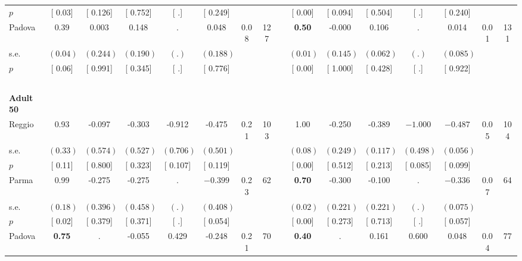 \begin{longtable}{L{8em} c c c c c c c p{1em} c c c c c c c}
\quad \quad \quad \quad $ p$ & [     0.03] & [    0.126] & [    0.752] & [        .] & [    0.249] & & & & [     0.00] & [    0.094] & [    0.504] & [        .] & [    0.240] & &  \\[1em]
\quad \quad \quad Padova& 0.39 &     0.003 &     0.148 &         . &     0.048 &      0.08 &       127 & & \textbf{     0.50} &    -0.000 &     0.106 &         . &     0.014 &      0.01 &       131  \\*
\quad \quad \quad \quad s.e.& $ (     0.04)$ & $ (    0.244)$ & $ (    0.190)$ & $ (        .)$ & $ (    0.188)$ & & & & $ (     0.01)$ & $ (    0.145)$ & $ (    0.062)$ & $ (        .)$ & $ (    0.085)$ & &  \\*
\quad \quad \quad \quad $ p$ & [     0.06] & [    0.991] & [    0.345] & [        .] & [    0.776] & & & & [     0.00] & [    1.000] & [    0.428] & [        .] & [    0.922] & &  \\[1em]
~\\[1em]
\quad \quad \textbf{Adult 50} & & & & & & & & & & & & & & & \\* 
\quad \quad \quad Reggio& 0.93 &    -0.097 &    -0.303 &    -0.912 &    -0.475 &      0.21 &       103 & & 1.00 &    -0.250 &    -0.389 & $ \mathbf{   -1.000}$ & $ \mathbf{   -0.487}$ &      0.05 &       104  \\*
\quad \quad \quad \quad s.e.& $ (     0.33)$ & $ (    0.574)$ & $ (    0.527)$ & $ (    0.706)$ & $ (    0.501)$ & & & & $ (     0.08)$ & $ (    0.249)$ & $ (    0.117)$ & $ (    0.498)$ & $ (    0.056)$ & &  \\*
\quad \quad \quad \quad $ p$ & [     0.11] & [    0.800] & [    0.323] & [    0.107] & [    0.119] & & & & [     0.00] & [    0.512] & [    0.213] & [    0.085] & [    0.099] & &  \\[1em]
\quad \quad \quad Parma& 0.99 &    -0.275 &    -0.275 &         . & $ \mathbf{   -0.399}$ &      0.23 &        62 & & \textbf{     0.70} &    -0.300 &    -0.100 &         . & $ \mathbf{   -0.336}$ &      0.07 &        64  \\*
\quad \quad \quad \quad s.e.& $ (     0.18)$ & $ (    0.396)$ & $ (    0.458)$ & $ (        .)$ & $ (    0.408)$ & & & & $ (     0.02)$ & $ (    0.221)$ & $ (    0.221)$ & $ (        .)$ & $ (    0.075)$ & &  \\*
\quad \quad \quad \quad $ p$ & [     0.02] & [    0.379] & [    0.371] & [        .] & [    0.054] & & & & [     0.00] & [    0.273] & [    0.713] & [        .] & [    0.057] & &  \\[1em]
\quad \quad \quad Padova& \textbf{     0.75} &         . &    -0.055 &     0.429 &    -0.248 &      0.21 &        70 & & \textbf{     0.40} &         . &     0.161 &     0.600 &     0.048 &      0.04 &        77  \\*

\end{longtable}
